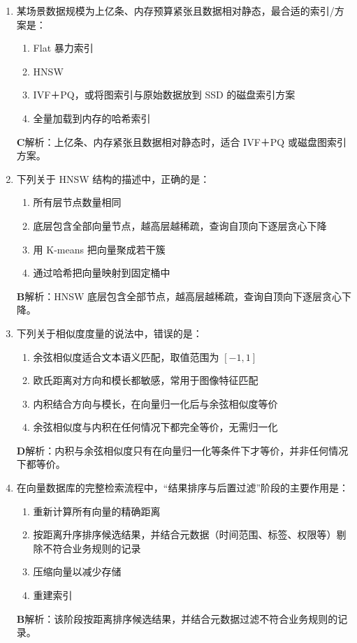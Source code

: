 \documentclass[UTF8,a4paper,11pt]{ctexart}
\newenvironment{answer}%
  {\begin{ans}\noindent{\bfseries\color{ansframe}【答案】}\hspace{0.4em}}%
  {\end{ans}}
\begin{document}
\begin{enumerate}
\item 某场景数据规模为上亿条、内存预算紧张且数据相对静态，最合适的索引/方案是：
\begin{enumerate}[label=\Alph*., leftmargin=2.2em, itemsep=1pt]
\item Flat 暴力索引
\item HNSW
\item IVF＋PQ，或将图索引与原始数据放到 SSD 的磁盘索引方案
\item 全量加载到内存的哈希索引
\end{enumerate}
\begin{answer}
\textbf{C}\quad 解析：上亿条、内存紧张且数据相对静态时，适合 IVF＋PQ 或磁盘图索引方案。
\end{answer}

\item 下列关于 HNSW 结构的描述中，正确的是：
\begin{enumerate}[label=\Alph*., leftmargin=2.2em, itemsep=1pt]
\item 所有层节点数量相同
\item 底层包含全部向量节点，越高层越稀疏，查询自顶向下逐层贪心下降
\item 用 K-means 把向量聚成若干簇
\item 通过哈希把向量映射到固定桶中
\end{enumerate}
\begin{answer}
\textbf{B}\quad 解析：HNSW 底层包含全部节点，越高层越稀疏，查询自顶向下逐层贪心下降。
\end{answer}

\item 下列关于相似度度量的说法中，错误的是：
\begin{enumerate}[label=\Alph*., leftmargin=2.2em, itemsep=1pt]
\item 余弦相似度适合文本语义匹配，取值范围为 $[-1,1]$
\item 欧氏距离对方向和模长都敏感，常用于图像特征匹配
\item 内积结合方向与模长，在向量归一化后与余弦相似度等价
\item 余弦相似度与内积在任何情况下都完全等价，无需归一化
\end{enumerate}
\begin{answer}
\textbf{D}\quad 解析：内积与余弦相似度只有在向量归一化等条件下才等价，并非任何情况下都等价。
\end{answer}

\item 在向量数据库的完整检索流程中，“结果排序与后置过滤”阶段的主要作用是：
\begin{enumerate}[label=\Alph*., leftmargin=2.2em, itemsep=1pt]
\item 重新计算所有向量的精确距离
\item 按距离升序排序候选结果，并结合元数据（时间范围、标签、权限等）剔除不符合业务规则的记录
\item 压缩向量以减少存储
\item 重建索引
\end{enumerate}
\begin{answer}
\textbf{B}\quad 解析：该阶段按距离排序候选结果，并结合元数据过滤不符合业务规则的记录。
\end{answer}


\end{enumerate}
\end{document}
